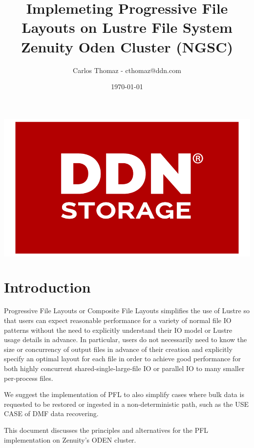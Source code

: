 \documentclass{article}
\title{%
Implemeting Progressive File Layouts on Lustre File System \\
\large Zenuity Oden Cluster (NGSC)}
\author{Carlos Thomaz - cthomaz@ddn.com}
\date{\today}
\begin{document}
\maketitle


\begin{center}
    \includegraphics[scale=0.14]{logo.png}\\[1cm] 
\end{center}

\newpage

\begin{versionhistory}

\end{versionhistory}


\newpage
\section{Introduction}
Progressive File Layouts or Composite File Layouts simplifies the use of Lustre so that users can expect reasonable performance for a variety of normal file IO patterns without the need to explicitly understand their IO model or Lustre usage details in advance. In particular, users do not necessarily need to know the size or concurrency of output files in advance of their creation and explicitly specify an optimal layout for each file in order to achieve good performance for both highly concurrent shared-single-large-file IO or parallel IO to many smaller per-process files. 

We suggest the implementation of PFL to also simplify cases where bulk data is requested to be restored or ingested in a non-deterministic path, such as the USE CASE of DMF data recovering.

This document discusses the principles and alternatives for the PFL implementation on Zenuity's ODEN cluster.
\end{document}
